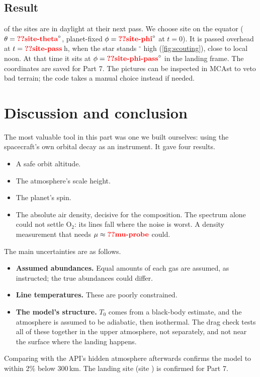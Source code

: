 \documentclass[aps,prd,twocolumn,nofootinbib,floatfix,superscriptaddress]{revtex4-2}
\begin{document}
\subsection{Result}
 of the  sites are in daylight at their next pass.
We choose site  on the equator ($\theta=\val{site-theta}^\circ$, planet-fixed $\phi=\val{site-phi}^\circ$ at $t=0$).
It is passed overhead at $t=\val{site-pass}$\,h, when the star stands $^\circ$ high (\cref{fig:scouting}), close to local noon.
At that time it sits at $\phi=\val{site-phi-pass}^\circ$ in the landing frame.
The coordinates are saved for Part 7.
The pictures can be inspected in MCAst to veto bad terrain; the code takes a manual choice instead if needed.


\section{Discussion and conclusion}
The most valuable tool in this part was one we built ourselves: using the spacecraft's own orbital decay as an instrument.
It gave four results.
\begin{itemize}
\item A safe orbit altitude.
\item The atmosphere's scale height.
\item The planet's spin.
\item The absolute air density, decisive for the composition. The spectrum alone could not settle O$_2$: its lines fall where the noise is worst. A density measurement that needs $\mu\approx\val{mu-probe}$ could.
\end{itemize}

The main uncertainties are as follows.
\begin{itemize}
\item \textbf{Assumed abundances.} Equal amounts of each gas are assumed, as instructed; the true abundances could differ.
\item \textbf{Line temperatures.} These are poorly constrained.
\item \textbf{The model's structure.} $T_0$ comes from a black-body estimate, and the atmosphere is assumed to be adiabatic, then isothermal. The drag check tests all of these together in the upper atmosphere, not separately, and not near the surface where the landing happens.
\end{itemize}
Comparing with the API's hidden atmosphere afterwards confirms the model to within 2\% below 300\,km.
The landing site (site ) is confirmed for Part 7.
\end{document}
